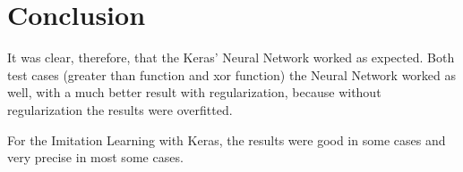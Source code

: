 \documentclass[journal]{IEEEtran}
\begin{document}
\section {Conclusion}

It was clear, therefore, that the Keras' Neural Network worked as expected. Both test cases (greater than function and xor function) the Neural Network worked as well, with a much better result with regularization, because without regularization the results were overfitted.

For the Imitation Learning with Keras, the results were good in some cases and very precise in most some cases.

\vfill
\end{document}
